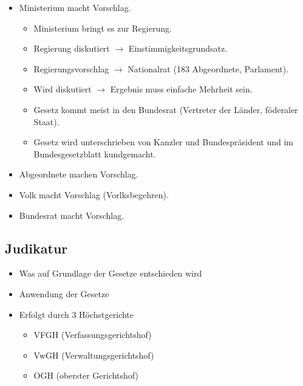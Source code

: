 \documentclass[12pt]{article}
\begin{document}
    \begin{itemize}
        \item Ministerium macht Vorschlag.
        \begin{itemize}
            \item Ministerium bringt es zur Regierung.
            \item Regierung diskutiert \(\rightarrow\) Einstimmigkeitsgrundsatz.
            \item Regierungsvorschlag \(\rightarrow\) Nationalrat (183 Abgeordnete, Parlament).
            \item Wird diskutiert \(\rightarrow\) Ergebnis muss einfache Mehrheit sein.
            \item Gesetz kommt meist in den Bundesrat (Vertreter der Länder, föderaler Staat).
            \item Gesetz wird unterschrieben von Kanzler und Bundespräsident und im Bundesgesetzblatt kundgemacht.
        \end{itemize}
        \item Abgeordnete machen Vorschlag.
        \item Volk macht Vorschlag (Vorlksbegehren).
        \item Bundesrat macht Vorschlag.
    \end{itemize}

    \subsection{Judikatur}
    \begin{itemize}
        \item Was auf Grundlage der Gesetze entschieden wird
        \item Anwendung der Gesetze
        \item Erfolgt durch 3 Höchstgerichte
        \begin{itemize}
            \item VFGH (Verfassungsgerichtshof)
            \item VwGH (Verwaltungsgerichtshof)
            \item OGH (oberster Gerichtshof)
        \end{itemize}
    \end{itemize}
\end{document}
